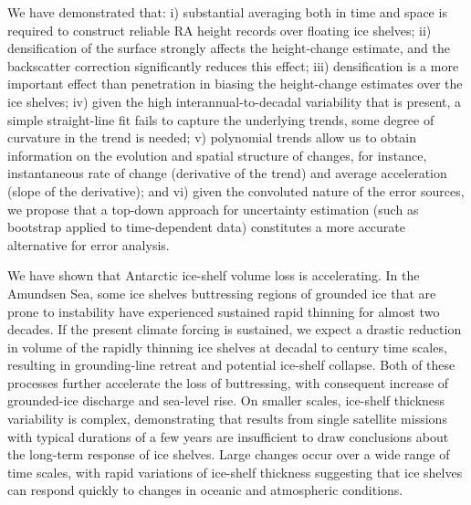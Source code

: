 We have demonstrated that: i) substantial averaging both in time and space is required to
construct reliable RA height records over floating ice shelves; ii) densification of the surface
strongly affects the height-change estimate, and the backscatter correction significantly reduces
this effect; iii) densification is a more important effect than penetration in biasing the height-change
estimates over the ice shelves; iv) given the high interannual-to-decadal variability that is present, a
simple straight-line fit fails to capture the underlying trends, some degree of curvature in the
trend is needed; v) polynomial trends allow us to obtain information on the evolution and spatial
structure of changes, for instance, instantaneous rate of change (derivative of the trend) and average
acceleration (slope of the derivative); and vi) given the convoluted nature of the error sources, we
propose that a top-down approach for uncertainty estimation (such as bootstrap applied to time-dependent data) constitutes a more accurate alternative for error analysis.

We have shown that Antarctic ice-shelf volume
loss is accelerating. In the Amundsen Sea,
some ice shelves buttressing regions of grounded
ice that are prone to instability have experienced
sustained rapid thinning for almost two decades.
If the present climate forcing is sustained, we
expect a drastic reduction in volume of the rapidly
thinning ice shelves at decadal to century
time scales, resulting in grounding-line retreat
and potential ice-shelf collapse. Both of these processes
further accelerate the loss of buttressing,
with consequent increase of grounded-ice
discharge and sea-level rise. On smaller scales,
ice-shelf thickness variability is complex, demonstrating
that results from single satellite missions
with typical durations of a few years are
insufficient to draw conclusions about the long-term
response of ice shelves. Large changes occur
over a wide range of time scales, with rapid variations
of ice-shelf thickness suggesting that ice
shelves can respond quickly to changes in oceanic
and atmospheric conditions.

